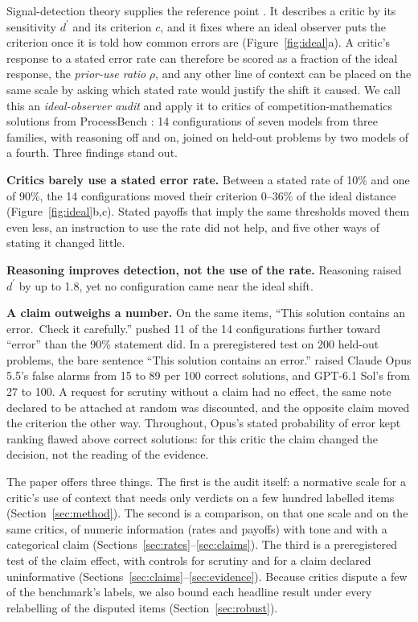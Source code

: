 \documentclass[letterpaper]{article} %
\newcommand{\dprime}{d^{\prime}}
\begin{document}
Signal-detection theory supplies the reference point \citep{green1966signal,macmillan2005detection}. It describes a critic by its sensitivity $\dprime$ and its criterion $c$, and it fixes where an ideal observer puts the criterion once it is told how common errors are (Figure~\ref{fig:ideal}a). A critic's response to a stated error rate can therefore be scored as a fraction of the ideal response, the \emph{prior-use ratio} $\rho$, and any other line of context can be placed on the same scale by asking which stated rate would justify the shift it caused. We call this an \emph{ideal-observer audit} and apply it to critics of competition-mathematics solutions from ProcessBench \citep{zheng2025processbench}: 14 configurations of seven models from three families, with reasoning off and on, joined on held-out problems by two models of a fourth. Three findings stand out.

\textbf{Critics barely use a stated error rate.} Between a stated rate of 10\% and one of 90\%, the 14 configurations moved their criterion 0--36\% of the ideal distance (Figure~\ref{fig:ideal}b,c). Stated payoffs that imply the same thresholds moved them even less, an instruction to use the rate did not help, and five other ways of stating it changed little.

\textbf{Reasoning improves detection, not the use of the rate.} Reasoning raised $\dprime$ by up to 1.8, yet no configuration came near the ideal shift.

\textbf{A claim outweighs a number.} On the same items, ``This solution contains an error.\ Check it carefully.'' pushed 11 of the 14 configurations further toward ``error'' than the 90\% statement did. In a preregistered test on 200 held-out problems, the bare sentence ``This solution contains an error.'' raised Claude Opus 5.5's false alarms from 15 to 89 per 100 correct solutions, and GPT-6.1 Sol's from 27 to 100. A request for scrutiny without a claim had no effect, the same note declared to be attached at random was discounted, and the opposite claim moved the criterion the other way. Throughout, Opus's stated probability of error kept ranking flawed above correct solutions: for this critic the claim changed the decision, not the reading of the evidence.

The paper offers three things. The first is the audit itself: a normative scale for a critic's use of context that needs only verdicts on a few hundred labelled items (Section~\ref{sec:method}). The second is a comparison, on that one scale and on the same critics, of numeric information (rates and payoffs) with tone and with a categorical claim (Sections~\ref{sec:rates}--\ref{sec:claims}). The third is a preregistered test of the claim effect, with controls for scrutiny and for a claim declared uninformative (Sections~\ref{sec:claims}--\ref{sec:evidence}). Because critics dispute a few of the benchmark's labels, we also bound each headline result under every relabelling of the disputed items (Section~\ref{sec:robust}).
\end{document}
